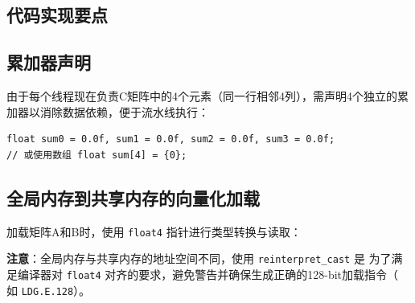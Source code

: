 \subsection{代码实现要点}

\subsection{累加器声明}
由于每个线程现在负责C矩阵中的4个元素（同一行相邻4列），需声明4个独立的累加器以消除数据依赖，便于流水线执行：
\begin{lstlisting}[style=mystyle]
float sum0 = 0.0f, sum1 = 0.0f, sum2 = 0.0f, sum3 = 0.0f;
// 或使用数组 float sum[4] = {0};
\end{lstlisting}

\subsection{全局内存到共享内存的向量化加载}
加载矩阵A和B时，使用 \texttt{float4} 指针进行类型转换与读取：

\textbf{注意}：全局内存与共享内存的地址空间不同，使用 \texttt{reinterpret\_cast} 是
为了满足编译器对 \texttt{float4} 对齐的要求，避免警告并确保生成正确的128-bit加载指令（
如 \texttt{LDG.E.128}）。

